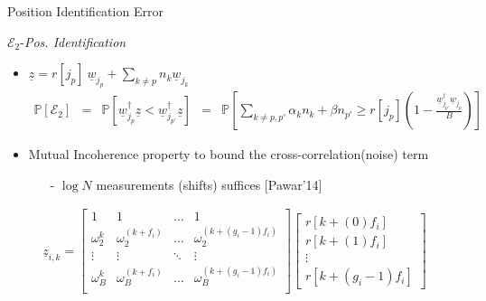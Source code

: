 \documentclass[10pt,xcolor=table]{beamer}
\newcommand{\mc}{\mathcal}
\newcommand{\mbb}{\mathbb}
\newcommand{\wv}{\underline{w}}
\newcommand{\zv}{\underline{z}}
\begin{document}
\begin{frame}{Position Identification Error}

\begin{block}{$\mathcal{E}_2${-\it Pos. Identification}}
	\begin{itemize}
		\item $\underline{z} =  r[j_p] ~ \wv_{j_p}+ \sum_{k \neq p}n_k \wv_{j_k}$
		\begin{align*}
		\mbb{P}[\mc{E}_2] &= & \mbb{P}[\wv_{j_p}^{\dagger}\underline{z}< \wv_{j_{p'}}^{\dagger}\underline{z}]
		&= & \mbb{P}[\sum_{k \neq p,p'}\alpha_k n_k+\beta n_{p'}\geq  r[j_p]\left(1-\frac{\wv_{j_{p'}}^{\dagger}\wv_{j_p}}{B}\right)]
		\end{align*}
		
		\item Mutual Incoherence property to bound the cross-correlation(noise) term
		\begin{itemize}
			\item [-] $\log N$ measurements (shifts) suffices [Pawar'14]
		\end{itemize}
	\end{itemize}
\end{block}
\begin{align} \nonumber
\zv_{i,k}= \begin{bmatrix}
1 & 1 & \ldots & 1 \\
\omega^{k}_{2} & \omega^{(k+f_i)}_{2} & \ldots & \omega^{(k+(g_i-1)f_i)}_{2}   \\
\vdots & \vdots & \ddots & \vdots\\
\omega^{k}_{B} & \omega^{(k+f_i)}_{B} & \ldots & \omega^{(k+(g_i-1)f_i)}_{B} \\
\end{bmatrix} 
\begin{bmatrix}
r[k+(0)f_i] \\
r[k+(1)f_i] \\
\vdots\\
r[k+(g_i-1)f_i]
\end{bmatrix}
\end{align}	
\end{frame}
\end{document}
